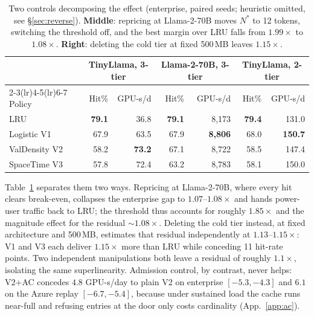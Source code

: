 \documentclass{article}
\begin{document}
\begin{table}[b]
\centering
\caption{Two controls decomposing the effect (enterprise, paired seeds; heuristic omitted, see \S\ref{sec:reverse}). \textbf{Middle}: repricing at Llama-2-70B moves $N^{*}$ to 12 tokens, switching the threshold off, and the best margin over LRU falls from $1.99\times$ to $1.08\times$. \textbf{Right}: deleting the cold tier at fixed 500\,MB leaves $1.15\times$.}
\label{tab:controls}
\small
\begin{tabular}{@{}lrrrrrr@{}}
\toprule
 & \multicolumn{2}{c}{TinyLlama, 3-tier} & \multicolumn{2}{c}{Llama-2-70B, 3-tier} & \multicolumn{2}{c}{TinyLlama, 2-tier} \\
\cmidrule(lr){2-3}\cmidrule(lr){4-5}\cmidrule(lr){6-7}
Policy & Hit\% & GPU-s/d & Hit\% & GPU-s/d & Hit\% & GPU-s/d \\
\midrule
LRU           & \textbf{79.1} & 36.8          & \textbf{79.1} & 8{,}173          & \textbf{79.4} & 131.0 \\

Logistic V1   & 67.9 & 63.5                   & 67.9 & \textbf{8{,}806}          & 68.0 & \textbf{150.7} \\
ValDensity V2 & 58.2 & \textbf{73.2}          & 67.1 & 8{,}722                   & 58.5 & 147.4 \\
SpaceTime V3  & 57.8 & 72.4                   & 63.2 & 8{,}783                   & 58.1 & 150.0 \\
\bottomrule
\end{tabular}
\end{table}

Table~\ref{tab:controls} separates them two ways. Repricing at Llama-2-70B, where every hit clears break-even, collapses the enterprise gap to $1.07$--$1.08\times$ and hands power-user traffic back to LRU; the threshold thus accounts for roughly $1.85\times$ and the magnitude effect for the residual ${\sim}1.08\times$. Deleting the cold tier instead, at fixed architecture and 500\,MB, estimates that residual independently at $1.13$--$1.15\times$: V1 and V3 each deliver $1.15\times$ more than LRU while conceding 11 hit-rate points. Two independent manipulations both leave a residual of roughly $1.1\times$, isolating the same superlinearity. Admission control, by contrast, never helps: V2+AC concedes $4.8$ GPU-s/day to plain V2 on enterprise $[-5.3, -4.3]$ and $6.1$ on the Azure replay $[-6.7, -5.4]$, because under sustained load the cache runs near-full and refusing entries at the door only costs cardinality (App.~\ref{app:ac}).
\end{document}
